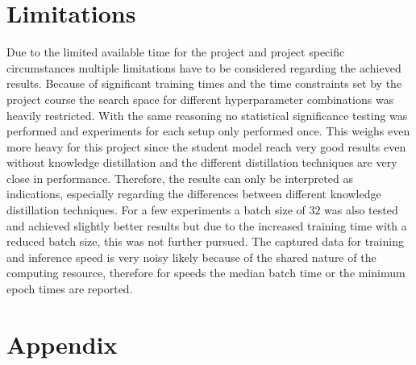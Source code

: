 \documentclass{article}
\begin{document}
\section{Limitations}
Due to the limited available time for the project and project specific circumstances multiple limitations have to be considered regarding the achieved results. Because of significant training times and the time constraints set by the project course the search space for different hyperparameter combinations was heavily restricted. With the same reasoning no statistical significance testing was performed and experiments for each setup only performed once. This weighs even more heavy for this project since the student model reach very good results even without knowledge distillation and the different distillation techniques are very close in performance. Therefore, the results can only be interpreted as indications, especially regarding the differences between different knowledge distillation techniques.
For a few experiments a batch size of $ 32 $ was also tested and achieved slightly better results but due to the increased training time with a reduced batch size, this was not further pursued.
The captured data for training and inference speed is very noisy likely because of the shared nature of the computing resource, therefore for speeds the median batch time or the minimum epoch times are reported.

\newpage
\section*{Appendix}


\end{document}
